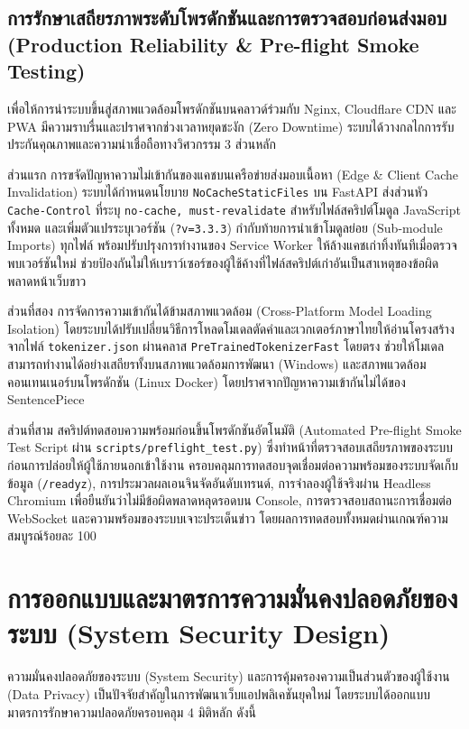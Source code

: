 \subsection{การรักษาเสถียรภาพระดับโพรดักชันและการตรวจสอบก่อนส่งมอบ (Production Reliability \& Pre-flight Smoke Testing)}

เพื่อให้การนำระบบขึ้นสู่สภาพแวดล้อมโพรดักชันบนคลาวด์ร่วมกับ Nginx, Cloudflare CDN และ PWA มีความราบรื่นและปราศจากช่วงเวลาหยุดชะงัก (Zero Downtime) ระบบได้วางกลไกการรับประกันคุณภาพและความน่าเชื่อถือทางวิศวกรรม 3 ส่วนหลัก

ส่วนแรก การขจัดปัญหาความไม่เข้ากันของแคชบนเครือข่ายส่งมอบเนื้อหา (Edge \& Client Cache Invalidation) ระบบได้กำหนดนโยบาย \texttt{NoCacheStaticFiles} บน FastAPI ส่งส่วนหัว \texttt{Cache-Control} ที่ระบุ \texttt{no-cache, must-revalidate} สำหรับไฟล์สคริปต์โมดูล JavaScript ทั้งหมด และเพิ่มตัวแปรระบุเวอร์ชัน (\texttt{?v=3.3.3}) กำกับท้ายการนำเข้าโมดูลย่อย (Sub-module Imports) ทุกไฟล์ พร้อมปรับปรุงการทำงานของ Service Worker ให้ล้างแคชเก่าทิ้งทันทีเมื่อตรวจพบเวอร์ชันใหม่ ช่วยป้องกันไม่ให้เบราว์เซอร์ของผู้ใช้ค้างที่ไฟล์สคริปต์เก่าอันเป็นสาเหตุของข้อผิดพลาดหน้าเว็บขาว

ส่วนที่สอง การจัดการความเข้ากันได้ข้ามสภาพแวดล้อม (Cross-Platform Model Loading Isolation) โดยระบบได้ปรับเปลี่ยนวิธีการโหลดโมเดลตัดคำและเวกเตอร์ภาษาไทยให้อ่านโครงสร้างจากไฟล์ \texttt{tokenizer.json} ผ่านคลาส \texttt{PreTrainedTokenizerFast} โดยตรง ช่วยให้โมเดลสามารถทำงานได้อย่างเสถียรทั้งบนสภาพแวดล้อมการพัฒนา (Windows) และสภาพแวดล้อมคอนเทนเนอร์บนโพรดักชัน (Linux Docker) โดยปราศจากปัญหาความเข้ากันไม่ได้ของ SentencePiece

ส่วนที่สาม สคริปต์ทดสอบความพร้อมก่อนขึ้นโพรดักชันอัตโนมัติ (Automated Pre-flight Smoke Test Script ผ่าน \texttt{scripts/preflight\_test.py}) ซึ่งทำหน้าที่ตรวจสอบเสถียรภาพของระบบก่อนการปล่อยให้ผู้ใช้ภายนอกเข้าใช้งาน ครอบคลุมการทดสอบจุดเชื่อมต่อความพร้อมของระบบจัดเก็บข้อมูล (\texttt{/readyz}), การประมวลผลเอนจินจัดอันดับเทรนด์, การจำลองผู้ใช้จริงผ่าน Headless Chromium เพื่อยืนยันว่าไม่มีข้อผิดพลาดหลุดรอดบน Console, การตรวจสอบสถานะการเชื่อมต่อ WebSocket และความพร้อมของระบบเจาะประเด็นข่าว โดยผลการทดสอบทั้งหมดผ่านเกณฑ์ความสมบูรณ์ร้อยละ 100


\section{การออกแบบและมาตรการความมั่นคงปลอดภัยของระบบ (System Security Design)}

ความมั่นคงปลอดภัยของระบบ (System Security) และการคุ้มครองความเป็นส่วนตัวของผู้ใช้งาน (Data Privacy) เป็นปัจจัยสำคัญในการพัฒนาเว็บแอปพลิเคชันยุคใหม่ โดยระบบได้ออกแบบมาตรการรักษาความปลอดภัยครอบคลุม 4 มิติหลัก ดังนี้

